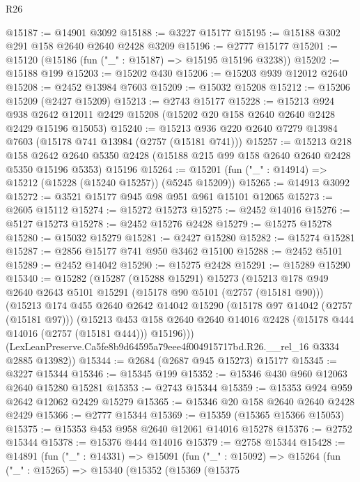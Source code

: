\begin{lexlean}{R26}
\begin{coremodule}
@15187 := @14901 @3092
@15188 := @3227 @15177
@15195 := @15188 @302 @291 @158 @2640 @2640 @2428 @3209
@15196 := @2777 @15177
@15201 := @15120 (@15186 (fun ("_" : @15187) => @15195 @15196 @3238))
@15202 := @15188 @199
@15203 := @15202 @430
@15206 := @15203 @939 @12012 @2640
@15208 := @2452 @13984 @7603
@15209 := @15032 @15208
@15212 := @15206 @15209 (@2427 @15209)
@15213 := @2743 @15177
@15228 := @15213
    @924
    @938
    @2642
    @12011
    @2429
    @15208
    (@15202 @20 @158 @2640 @2640 @2428 @2429 @15196 @15053)
@15240 := @15213 @936 @220 @2640 @7279 @13984 @7603 (@15178 @741 @13984 (@2757 (@15181 @741)))
@15257 := @15213
    @218
    @158
    @2642
    @2640
    @5350
    @2428
    (@15188 @215 @99 @158 @2640 @2640 @2428 @5350 @15196 @5353)
    @15196
@15264 := @15201 (fun ("_" : @14914) => @15212 (@15228 (@15240 @15257)) (@5245 @15209))
@15265 := @14913 @3092
@15272 := @3521 @15177 @945 @98 @951 @961 @15101 @12065
@15273 := @2605 @15112
@15274 := @15272 @15273
@15275 := @2452 @14016
@15276 := @5127 @15273
@15278 := @2452 @15276 @2428
@15279 := @15275 @15278
@15280 := @15032 @15279
@15281 := @2427 @15280
@15282 := @15274 @15281
@15287 := @2856 @15177 @741 @950 @3462 @15100
@15288 := @2452 @5101
@15289 := @2452 @14042
@15290 := @15275 @2428
@15291 := @15289 @15290
@15340 := @15282
    (@15287
      (@15288 @15291)
      @15273
      (@15213
        @178
        @949
        @2640
        @2643
        @5101
        @15291
        (@15178 @90 @5101 (@2757 (@15181 @90)))
        (@15213
          @174
          @455
          @2640
          @2642
          @14042
          @15290
          (@15178 @97 @14042 (@2757 (@15181 @97)))
          (@15213
            @453
            @158
            @2640
            @2640
            @14016
            @2428
            (@15178 @444 @14016 (@2757 (@15181 @444)))
            @15196)))
      (LexLeanPreserve.Ca5fe8b9d64595a79eee4f004915717bd.R26.__rel_16 @3334 @2885 @13982))
@15344 := @2684 (@2687 @945 @15273) @15177
@15345 := @3227 @15344
@15346 := @15345 @199
@15352 := @15346 @430 @960 @12063 @2640 @15280 @15281
@15353 := @2743 @15344
@15359 := @15353 @924 @959 @2642 @12062 @2429 @15279
@15365 := @15346 @20 @158 @2640 @2640 @2428 @2429
@15366 := @2777 @15344
@15369 := @15359 (@15365 @15366 @15053)
@15375 := @15353 @453 @958 @2640 @12061 @14016 @15278
@15376 := @2752 @15344
@15378 := @15376 @444 @14016
@15379 := @2758 @15344
@15428 := @14891
    (fun ("_" : @14331) =>
    @15091
      (fun ("_" : @15092) =>
      @15264
        (fun ("_" : @15265) =>
        @15340
          (@15352
            (@15369
              (@15375

\end{coremodule}
\end{lexlean}
